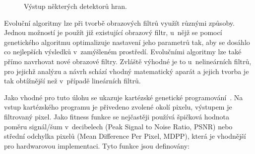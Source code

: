 \begin{figure}[htb]
    \centering
    \caption{Výstup některých detektorů hran.}
    \label{obrDetektor}
\end{figure}



Evoluční algoritmy lze při tvorbě obrazových filtrů využít různými způsoby. Jednou možností je použít již existující obrazový filtr, u~nějž se pomocí genetického algoritmu optimalizuje nastavení jeho parametrů tak, aby se dosáhlo co nejlepších výsledků v~zamýšleném prostředí. Evolučními algoritmy lze také přímo navrhovat nové obrazové filtry. Zvláště výhodné je to u~nelineárních filtrů, pro jejichž analýzu a návrh schází vhodný matematický aparát a jejich tvorba je tak obtížnější než v~případě lineárních filtrů.

Jako vhodné pro tuto úlohu se ukazuje kartézské genetické programování~\cite{ZelenaIF}. Na vstup kartézského programu je přivedeno zvolené okolí pixelu, výstupem je filtrovaný pixel. Jako fitness funkce se nejčastěji používá špičková hodnota poměru signál/šum v~decibelech (Peak Signal to Noise Ratio, PSNR) nebo střední odchylka pixelů (Mean Difference Per Pixel, MDPP), která je vhodnější pro hardwarovou implementaci. Tyto funkce jsou definovány:

